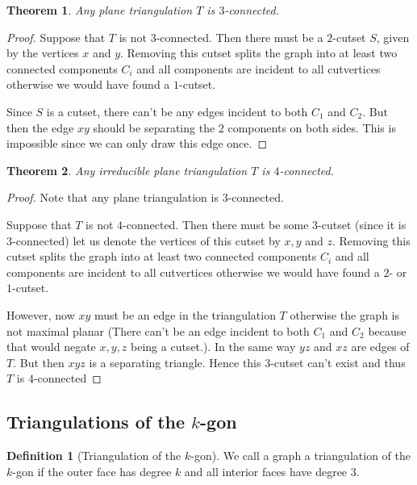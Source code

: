 \documentclass[a4paper]{article}
\newtheorem{thrm}{Theorem}
\theoremstyle{definition}
\newtheorem*{defi}{Definition}
\begin{document}
\begin{thrm}
Any plane triangulation $T$ is $3$-connected.
\end{thrm}

\begin{proof}
Suppose that $T$ is not $3$-connected. Then there must be a $2$-cutset $S$, given by the vertices $x$ and $y$. Removing this cutset splits the graph into at least two connected components $C_i$ and all components are incident to all cutvertices otherwise we would have found a $1$-cutset.

Since $S$ is a cutset, there can't be any edges incident to both $C_1$ and $C_2$. But then the edge $xy$ should be separating the $2$ components on both sides. This is impossible since we can only draw this edge once. %
\end{proof}

\begin{thrm}
Any irreducible plane triangulation $T$ is $4$-connected.
\end{thrm}

\begin{proof}
Note that any plane triangulation is $3$-connected.

Suppose that $T$ is not $4$-connected. Then there must be some $3$-cutset (since it is $3$-connected) let us denote the vertices of this cutset by $x, y$ and $z$. Removing this cutset splits the graph into at least two connected components $C_i$ and all components are incident to all cutvertices otherwise we would have found a $2$- or $1$-cutset.  

However, now $xy$ must be an edge in the triangulation $T$ otherwise the graph is not maximal planar (There can't be an edge incident to both $C_1$ and $C_2$ because that would negate $x, y ,z$ being a cutset.). In the same way $yz$ and $xz$ are edges of $T$. But then $xyz$ is a separating triangle. Hence this $3$-cutset can't exist and thus $T$ is $4$-connected
\end{proof}

\subsection{Triangulations of the $k$-gon}

\begin{defi}[Triangulation of the $k$-gon]
We call a graph a triangulation of the $k$-gon if the outer face has degree $k$ and all interior faces have degree $3$.
\end{defi}
\end{document}
